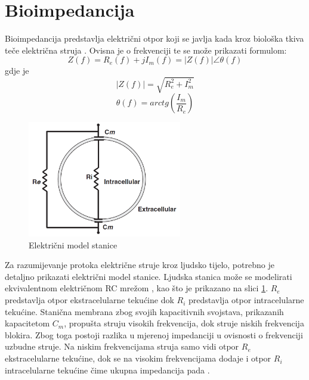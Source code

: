 \documentclass[../diplomski_rad.tex]{subfiles}
\begin{document}
\sloppy

\justifying

\section{Bioimpedancija}

Bioimpedancija predstavlja električni otpor koji se javlja kada kroz biološka tkiva teče električna struja \cite{Bera2014}.
Ovisna je o frekvenciji te se može prikazati formulom:
\begin{equation}
    \label{jed:cpe}
    Z(f) = R_{e}(f) + jI_{m}(f) = |Z(f)|\angle\theta(f) 
\end{equation}
gdje je
\begin{equation}
    \label{jed:cpe}
    |Z(f)| = \sqrt{R_{e}^{2} + I_{m}^{2}}
\end{equation} 
\begin{equation}
    \label{jed:cpe}
    \theta(f) = arctg(\frac{I_{m}}{R_{e}})
\end{equation} 

\begin{figure}[htb]
    \centering
    \includegraphics[width=0.6\textwidth]{Figures/stanica.png} 
    \caption{Električni model stanice \cite{Lukaski2013}}
    \label{slk:stanica}
\end{figure}
Za razumijevanje protoka električne struje kroz ljudsko tijelo, potrebno je detaljno prikazati električni model stanice.
Ljudska stanica može se modelirati ekvivalentnom električnom RC mrežom \cite{Lukaski2013}, 
kao što je prikazano na slici \ref{slk:stanica}. 
$R_{e}$ predstavlja otpor ekstracelularne tekućine dok $R_{i}$ predstavlja otpor intracelularne tekućine.
Stanična membrana zbog svojih kapacitivnih svojstava, prikazanih kapacitetom $C_{m}$, 
propušta struju visokih frekvencija, dok struje niskih frekvencija blokira. 
Zbog toga postoji razlika u mjerenoj impedanciji u ovisnosti o frekvenciji uzbudne struje. 
Na niskim frekvencijama struja samo vidi otpor $R_{e}$ ekstracelularne tekućine, dok se na visokim frekvencijama dodaje i otpor 
$R_{i}$ intracelularne tekućine čime ukupna impedancija pada \cite{Bera2014}.
\end{document}
